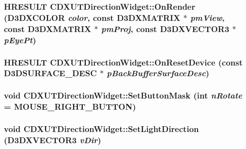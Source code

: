 \label{class_c_d_x_u_t_direction_widget_a9705e4cdb115b728a6a87d3d535ec64c}
\hypertarget{class_c_d_x_u_t_direction_widget_a794aeb666eb91f791434215cfe608edc}{
\subsubsection[{OnRender}]{\setlength{\rightskip}{0pt plus 5cm}HRESULT CDXUTDirectionWidget::OnRender (D3DXCOLOR {\em color}, \/  const D3DXMATRIX $\ast$ {\em pmView}, \/  const D3DXMATRIX $\ast$ {\em pmProj}, \/  const D3DXVECTOR3 $\ast$ {\em pEyePt})}}
\label{class_c_d_x_u_t_direction_widget_a794aeb666eb91f791434215cfe608edc}
\hypertarget{class_c_d_x_u_t_direction_widget_ae0750529e0920a79eb814782bf91132e}{
\subsubsection[{OnResetDevice}]{\setlength{\rightskip}{0pt plus 5cm}HRESULT CDXUTDirectionWidget::OnResetDevice (const D3DSURFACE\_\-DESC $\ast$ {\em pBackBufferSurfaceDesc})}}
\label{class_c_d_x_u_t_direction_widget_ae0750529e0920a79eb814782bf91132e}
\hypertarget{class_c_d_x_u_t_direction_widget_a00effccf13b6c745ab7e3d327a147074}{
\subsubsection[{SetButtonMask}]{\setlength{\rightskip}{0pt plus 5cm}void CDXUTDirectionWidget::SetButtonMask ({\bf int} {\em nRotate} = {\ttfamily MOUSE\_\-RIGHT\_\-BUTTON})}}
\label{class_c_d_x_u_t_direction_widget_a00effccf13b6c745ab7e3d327a147074}
\hypertarget{class_c_d_x_u_t_direction_widget_a05adf625e2a190ed1e238ddf1879e924}{
\subsubsection[{SetLightDirection}]{\setlength{\rightskip}{0pt plus 5cm}void CDXUTDirectionWidget::SetLightDirection (D3DXVECTOR3 {\em vDir})}}
